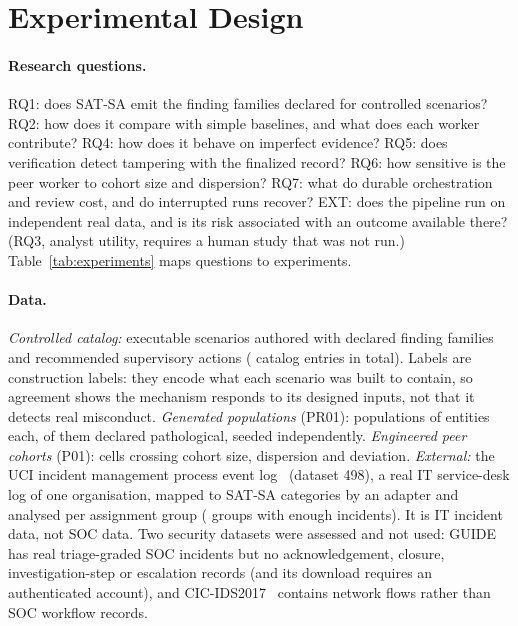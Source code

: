 \section{Experimental Design}
\label{sec:design}

\paragraph{Research questions.}
RQ1: does SAT-SA emit the finding families declared for controlled scenarios?
RQ2: how does it compare with simple baselines, and what does each worker
contribute? RQ4: how does it behave on imperfect evidence? RQ5: does verification
detect tampering with the finalized record? RQ6: how sensitive is the peer worker
to cohort size and dispersion? RQ7: what do durable orchestration and review cost,
and do interrupted runs recover? EXT: does the pipeline run on independent real
data, and is its risk associated with an outcome available there? (RQ3, analyst
utility, requires a human study that was not run.) Table~\ref{tab:experiments}
maps questions to experiments.


\paragraph{Data.}
\emph{Controlled catalog:}  executable scenarios authored
with declared finding families and recommended supervisory actions
( catalog entries in total). Labels are construction labels:
they encode what each scenario was built to contain, so agreement shows the
mechanism responds to its designed inputs, not that it detects real misconduct.
\emph{Generated populations} (PR01):  populations of
 entities each,  of them declared
pathological, seeded independently. \emph{Engineered peer cohorts} (P01):
 cells crossing cohort size, dispersion and deviation.
\emph{External:} the UCI incident management process event log~\cite{amaral2018uci498}
(dataset 498), a real IT service-desk log of one organisation, mapped to SAT-SA
categories by an adapter and analysed per assignment group
( groups with enough incidents). It is IT incident data, not SOC
data. Two security datasets were assessed and not used: GUIDE~\cite{freitas2024guide}
has real triage-graded SOC incidents but no acknowledgement, closure,
investigation-step or escalation records (and its download requires an
authenticated account), and CIC-IDS2017~\cite{sharafaldin2018cicids} contains
network flows rather than SOC workflow records.

